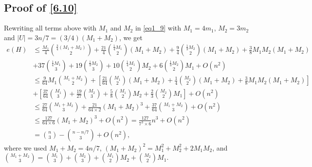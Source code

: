 \documentclass[11pt, reqno]{amsart}    	%
\theoremstyle{definition}
\numberwithin{equation}{section}
\begin{document}
\begin{appendix}
	
	
	\section{Proof of \eqref{6.10}}
Rewriting all terms above with $M_1$ and $M_2$ in \eqref{eq1_9} with  $M_1=4m_1$, $M_2=3m_2$ and $|U|=3n/7=(3/4)(M_1+M_2)$, we get
	\begin{align*}	
	e(H)&\le \frac{M_1}{4}\binom{\frac{3}{4}(M_1+M_2)}{2}+\frac{21}{4}\binom{\frac{1}{4}M_1}{2}(M_1+M_2)+\frac{9}{4}\binom{\frac{1}{3}M_2}{2}(M_1+M_2)+\frac{3}{8}M_1M_2(M_1+M_2)\\&+37\binom{\frac{1}{4}M_1}{3}+19\binom{\frac{1}{3}M_2}{3}+10\binom{\frac{1}{4}M_1}{2}M_2+6\binom{\frac{1}{3}M_2}{2}M_1+O(n^2)\\&\le\frac{9}{64}M_1\binom{M_1+M_2}{2}+\left[\frac{21}{64}\binom{M_1}{2}(M_1+M_2)+\frac{1}{4}\binom{M_2}{2}(M_1+M_2)+\frac{3}{8}M_1M_2(M_1+M_2)\right]\\&+\left[\frac{37}{64} \binom{M_1}{3}+\frac{19}{27}\binom{M_2}{3}+\frac{5}{8}\binom{M_1}{2}M_2+\frac{2}{3}\binom{M_2}{2}M_1\right]+O(n^2)\\&\le\frac{27}{64}\binom{M_1+M_2}{3}+\frac{21}{64\times 2}(M_1+M_2)^3+\frac{37}{64}\binom{M_1+M_2}{3}+O(n^2)\\&\le \frac{127}{64\times 6}(M_1+M_2)^3 + O(n^2)= \frac{127}{7^3\times 6}n^3+O(n^2) \\&= \binom{n}{3}-\binom{n- n/7}{3}+O(n^2), 
\end{align*}
where we used $M_1+M_2=4n/7$, $(M_1+M_2)^2=M_{1}^{2}+M_{2}^{2}+2M_{1}M_{2}$, and $ \binom{M_1+M_2}{3}=\binom{M_1}{3}+\binom{M_2}{3}+\binom{M_1}{2}M_2+\binom{M_2}{2}M_1 $.
\end{appendix}
\end{document}
